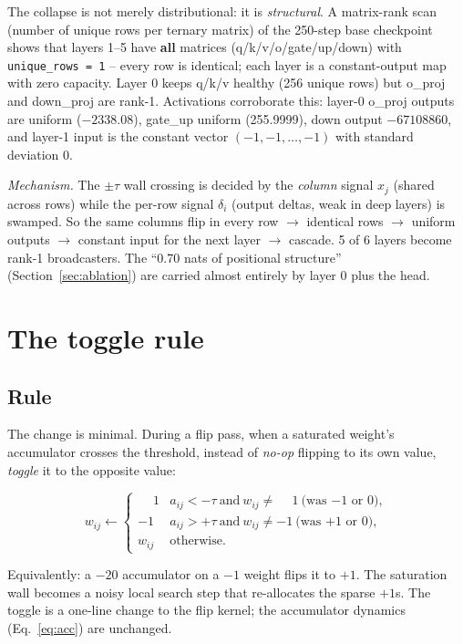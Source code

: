 \documentclass{article} %
\begin{document}
The collapse is not merely distributional: it is \emph{structural}. A matrix-rank scan (number of unique rows per ternary matrix) of the 250-step base checkpoint shows that layers 1--5 have \textbf{all} matrices (q/k/v/o/gate/up/down) with \texttt{unique\_rows = 1} -- every row is identical; each layer is a constant-output map with zero capacity. Layer 0 keeps q/k/v healthy (256 unique rows) but o\_proj and down\_proj are rank-1. Activations corroborate this: layer-0 o\_proj outputs are uniform ($-2338.08$), gate\_up uniform (255.9999), down output $-67108860$, and layer-1 input is the constant vector $(-1,-1,\dots,-1)$ with standard deviation 0.

\emph{Mechanism.} The $\pm\tau$ wall crossing is decided by the \emph{column} signal $x_j$ (shared across rows) while the per-row signal $\delta_i$ (output deltas, weak in deep layers) is swamped. So the same columns flip in every row $\rightarrow$ identical rows $\rightarrow$ uniform outputs $\rightarrow$ constant input for the next layer $\rightarrow$ cascade. 5 of 6 layers become rank-1 broadcasters. The ``0.70 nats of positional structure'' (Section~\ref{sec:ablation}) are carried almost entirely by layer 0 plus the head.

\section{The toggle rule}
\label{sec:toggle}

\subsection{Rule}
\label{sec:togglerule}

The change is minimal. During a flip pass, when a saturated weight's accumulator crosses the threshold, instead of \emph{no-op} flipping to its own value, \emph{toggle} it to the opposite value:

\begin{equation}
w_{ij} \leftarrow
\begin{cases}
\phantom{-}1 & a_{ij} < -\tau \ \text{and}\ w_{ij} \ne \phantom{-}1 \ \text{(was $-1$ or $0$)},\\
-1 & a_{ij} > +\tau \ \text{and}\ w_{ij} \ne -1 \ \text{(was $+1$ or $0$)},\\
w_{ij} & \text{otherwise}.
\end{cases}
\label{eq:toggle}
\end{equation}

Equivalently: a $-20$ accumulator on a $-1$ weight flips it to $+1$. The saturation wall becomes a noisy local search step that re-allocates the sparse $+1$s. The toggle is a one-line change to the flip kernel; the accumulator dynamics (Eq.~\ref{eq:acc}) are unchanged.
\end{document}
